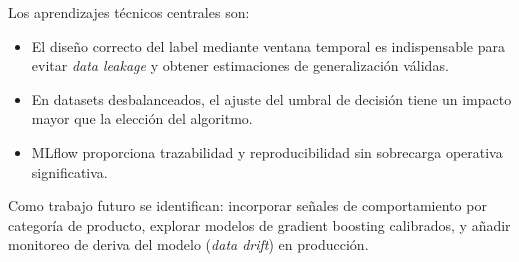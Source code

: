 \documentclass[11pt]{article}
\begin{document}
Los aprendizajes técnicos centrales son:
\begin{itemize}[leftmargin=1.5em, itemsep=2pt]
  \item El diseño correcto del label mediante ventana temporal es indispensable para evitar
        \textit{data leakage} y obtener estimaciones de generalización válidas.
  \item En datasets desbalanceados, el ajuste del umbral de decisión tiene un impacto mayor
        que la elección del algoritmo.
  \item MLflow proporciona trazabilidad y reproducibilidad sin sobrecarga operativa
        significativa.
\end{itemize}

Como trabajo futuro se identifican: incorporar señales de comportamiento por categoría de
producto, explorar modelos de gradient boosting calibrados, y añadir monitoreo de deriva
del modelo (\textit{data drift}) en producción.
\end{document}
